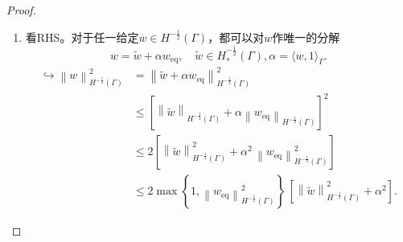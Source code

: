 \begin{proof}
  \begin{enumerate}
    \item 看RHS。对于任一给定$w \in H^{-\frac{1}{2}}(\Gamma)$，都可以对$w$作唯一的分解
  \begin{equation*}
    w = \widetilde{w} + \alpha w_{\text{eq}}, \quad \widetilde{w} \in H_{*}^{-\frac{1}{2}}(\Gamma), \alpha = \langle w, 1 \rangle_{\Gamma}.
  \end{equation*}
\begin{equation*}
\begin{split}
  \hookrightarrow \left\| w \right\|_{H^{-\frac{1}{2}}(\Gamma)}^{2} & =
  \left\|
  \widetilde{w} + \alpha w_{\text{eq}} \right\|_{H^{-\frac{1}{2}}(\Gamma)}^{2} \\
  & \le
  \left[
  \left\| \widetilde{w} \right\|_{H^{-\frac{1}{2}}(\Gamma)}
  + \alpha
  \left\| w_{\text{eq}} \right\|_{H^{-\frac{1}{2}}(\Gamma)}
  \right]^{2} \\
  & \le
  2 \left[
  \left\| \widetilde{w} \right\|_{H^{-\frac{1}{2}}(\Gamma)}^{2}
  + \alpha^{2} \,
  \left\| w_{\text{eq}} \right\|_{H^{-\frac{1}{2}}(\Gamma)}^{2}
  \right] \\
  & \le 2 \max \left\{ 1, \left\| w_{\text{eq}} \right\|_{H^{-\frac{1}{2}}(\Gamma)}^{2} \right\} \,
  \left[
  \left\| \widetilde{w} \right\|_{H^{-\frac{1}{2}}(\Gamma)}^{2}
  + \alpha^{2}
  \right].
\end{split}
\end{equation*}


\end{enumerate}
\end{proof}
